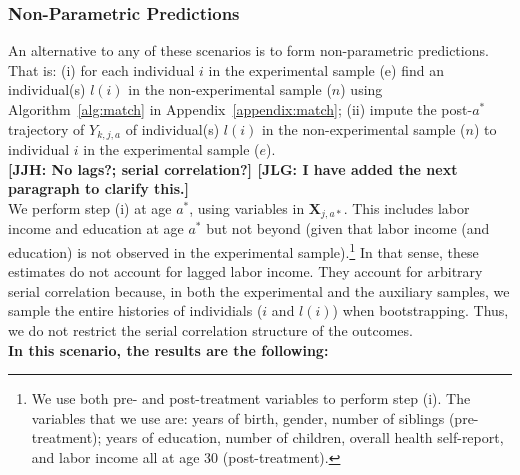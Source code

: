 \subsubsection{Non-Parametric Predictions}

\noindent An alternative to any of these scenarios is to form non-parametric predictions. That is: (i) for each individual $i$ in the experimental sample (e) find an individual(s) $l(i)$ in the non-experimental sample ($n$) using Algorithm~\ref{alg:match} in Appendix~\ref{appendix:match}; (ii) impute the post-$a^*$ trajectory of $Y_{k,j,a}$ of individual(s) $l(i)$ in the non-experimental sample ($n$) to individual $i$ in the experimental sample ($e$).\\ 

\noindent \textbf{[JJH: No lags?; serial correlation?] [JLG: I have added the next paragraph to clarify this.]}\\

\noindent We perform step (i) at age $a^*$, using variables in $\bm{X}_{j,a*}$. This includes labor income and education at age $a^*$ but not beyond (given that labor income (and education) is not observed in the experimental sample).\footnote{We use both pre- and post-treatment variables to perform step (i). The variables that we use are: years of birth, gender, number of siblings (pre-treatment); years of education, number of children, overall health self-report, and labor income all at age 30 (post-treatment).} In that sense, these estimates do not account for lagged labor income. They account for arbitrary serial correlation because, in both the experimental and the auxiliary samples, we sample the entire histories of individials ($i$ and $l(i)$) when bootstrapping. Thus, we do not restrict the serial correlation structure of the outcomes.\\

\noindent \textbf{In this scenario, the results are the following:}\\

